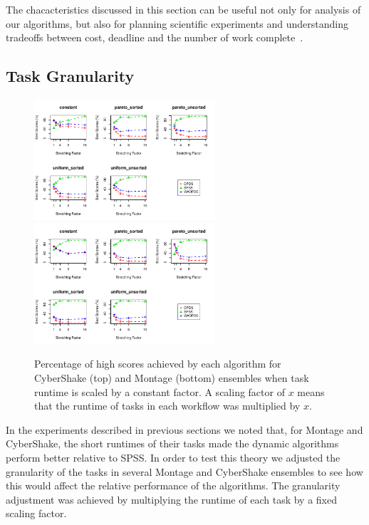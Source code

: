 \documentclass[preprint,5p]{elsarticle}
\begin{document}
The chacacteristics discussed in this section can be useful not only for
analysis of our algorithms, but also for planning scientific experiments and
understanding tradeoffs between cost, deadline and the number of work
complete~\cite{Malawski-FGCS-13}.





\subsection{Task Granularity}
\label{sec:granularity}

\begin{figure}[htb]
    \centering
    \includegraphics[width=0.6\textwidth]{run-stretching-test-output-scaling-CYBERSHAKE}
    \includegraphics[width=0.6\textwidth]{run-stretching-test-output-scaling-MONTAGE}
    \caption{Percentage of high scores achieved by each algorithm for CyberShake (top)
    and Montage (bottom) ensembles when task runtime is scaled by a constant factor. A
    scaling factor of $x$ means that the runtime of tasks in each workflow was
    multiplied by $x$.}
    \label{fig:stretching}
\end{figure}



In the experiments described in previous sections we noted that, for Montage and
CyberShake, the short runtimes of their tasks made the dynamic algorithms
perform better relative to SPSS. In order to test this theory we adjusted the
granularity of the tasks in several Montage and CyberShake ensembles to see how
this would affect the relative performance of the algorithms. The granularity
adjustment was achieved by multiplying the runtime of each task by a fixed
scaling factor.
\end{document}

